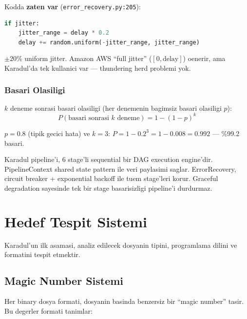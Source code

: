 \documentclass[12pt,a4paper,oneside]{book}
\theoremstyle{definition}
\newcommand{\file}[1]{\texttt{\color{yellow!70!white}#1}}
\newcommand{\prob}[1]{P\!\left(#1\right)}
\begin{document}
Kodda \textbf{zaten var} (\file{error\_recovery.py:205}):
\begin{lstlisting}[language=Python]
if jitter:
    jitter_range = delay * 0.2
    delay += random.uniform(-jitter_range, jitter_range)
\end{lstlisting}

$\pm 20\%$ uniform jitter. Amazon AWS ``full jitter'' ($[0, \text{delay}]$) oenerir, ama Karadul'da tek kullanici var --- thundering herd problemi yok.

\subsection{Basari Olasiligi}

$k$ deneme sonrasi basari olasiligi (her denemenin bagimsiz basari olasiligi $p$):
\begin{equation}
\prob{\text{basari sonrasi } k \text{ deneme}} = 1 - (1-p)^k
\end{equation}

$p = 0.8$ (tipik gecici hata) ve $k = 3$: $P = 1 - 0.2^3 = 1 - 0.008 = 0.992$ --- \%99.2 basari.

\begin{ozet}
Karadul pipeline'i, 6 stage'li sequential bir DAG execution engine'dir. PipelineContext shared state pattern ile veri paylasimi saglar. ErrorRecovery, circuit breaker + exponential backoff ile tuem stage'leri korur. Graceful degradation sayesinde tek bir stage basarisizligi pipeline'i durdurmaz.
\end{ozet}


\chapter{Hedef Tespit Sistemi}
\label{ch:target}

Karadul'un ilk asamasi, analiz edilecek dosyanin tipini, programlama dilini ve format\-ini tespit etmektir.

\section{Magic Number Sistemi}
\label{sec:magic}

Her binary dosya formati, dosyanin bas\-inda benzersiz bir ``magic number'' tasir. Bu degerler formati tanimlar:
\end{document}
